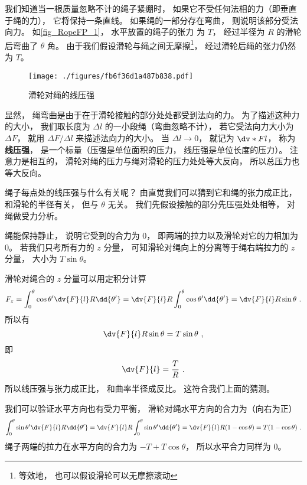 

我们知道当一根质量忽略不计的绳子紧绷时， 如果它不受任何法相的力（即垂直于绳的力）， 它将保持一条直线。 如果绳的一部分存在弯曲， 则说明该部分受法向力。 如\autoref{fig_RopeFP_1}， 水平放置的绳子的张力%
为 $T$， 经过半径为 $R$ 的滑轮后弯曲了 $\theta$ 角。 由于我们假设滑轮与绳之间无摩擦\footnote{等效地， 也可以假设滑轮可以无摩擦滚动}， 经过滑轮后绳的张力仍然为 $T$。
\begin{figure}[ht]
\centering
\texttt{[image: ./figures/fb6f36d1a487b838.pdf]}
\caption{滑轮对绳的线压强} \label{fig_RopeFP_1}
\end{figure}

显然， 绳弯曲是由于在于滑轮接触的部分处处都受到法向的力。 为了描述这种力的大小， 我们取长度为 $\Delta l$ 的一小段绳（弯曲忽略不计）， 若它受法向力大小为 $\Delta F$， 就用 $\Delta F/\Delta l$ 来描述法向力的大小。 当 $\Delta l \to 0$， 就记为 $\dv*{F}{l}$， 称为\textbf{线压强}， 是一个标量（压强是单位面积的压力， 线压强是单位长度的压力）。 注意力是相互的， 滑轮对绳的压力与绳对滑轮的压力处处等大反向， 所以总压力也等大反向。

绳子每点处的线压强与什么有关呢？ 由直觉我们可以猜到它和绳的张力成正比， 和滑轮的半径有关， 但与 $\theta$ 无关。 我们先假设接触的部分先压强处处相等， 对绳做受力分析。

绳能保持静止， 说明它受到的合力为 0， 即两端的拉力以及滑轮对它的力相加为 0。 若我们只考所有力的 $z$ 分量， 可知滑轮对绳向上的分离等于绳右端拉力的 $z$ 分量， 大小为 $T \sin\theta$。

滑轮对绳合的 $z$ 分量可以用定积分计算
\begin{equation}
F_z = \int_0^\theta \cos\theta' \dv{F}{l} R\dd{\theta'}
= \dv{F}{l} R \int_0^\theta \cos\theta' \dd{\theta'}
= \dv{F}{l} R \sin\theta~.
\end{equation}
所以有
\begin{equation}
\dv{F}{l} R \sin\theta = T \sin\theta~,
\end{equation}
即
\begin{equation}\label{eq_RopeFP_1}
\dv{F}{l} = \frac{T}{R}~.
\end{equation}
所以线压强与张力成正比， 和曲率半径成反比。 这符合我们上面的猜测。

我们可以验证水平方向也有受力平衡， 滑轮对绳水平方向的合力为（向右为正）
\begin{equation}
\int_0^\theta \sin\theta' \dv{F}{l} R\dd{\theta'}
= \dv{F}{l} R \int_0^\theta \sin\theta' \dd{\theta'}
= \dv{F}{l} R (1 - \cos\theta)
= T(1 - \cos\theta)~.
\end{equation}
绳子两端的拉力在水平方向的合力为 $-T + T\cos\theta$， 所以水平合力同样为 0。

